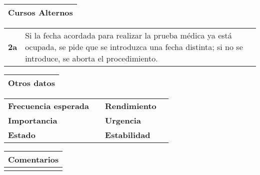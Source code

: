 \documentclass[11pt,a4paper]{article}
\begin{document}
\begin{table}[H]
	\begin{tabularx}{\textwidth}{X}
		\textbf{Cursos Alternos}\\ \hline
	\end{tabularx}
	\begin{tabularx}{\textwidth}{cX}
		\textbf{2a} & Si la fecha acordada para realizar la prueba médica ya está ocupada, se pide que se introduzca una fecha distinta; si no se introduce, se aborta el procedimiento. \\
	\end{tabularx}
\end{table}

\begin{table}[H]
	\begin{tabularx}{\textwidth}{X}
		\textbf{Otros datos}\\ \hline
	\end{tabularx}
	\begin{tabularx}{\textwidth}{lXlX}
		\textbf{Frecuencia esperada} &  & \textbf{Rendimiento} & \\
		\textbf{Importancia} & & \textbf{Urgencia} & \\
		\textbf{Estado} &  & \textbf{Estabilidad} & \\
	\end{tabularx}
	
	\bigskip
	
	\begin{tabularx}{\textwidth}{X}
		\textbf{Comentarios}\\ \hline
		[...] \\
	\end{tabularx}
\end{table}


\newpage




\end{document}

